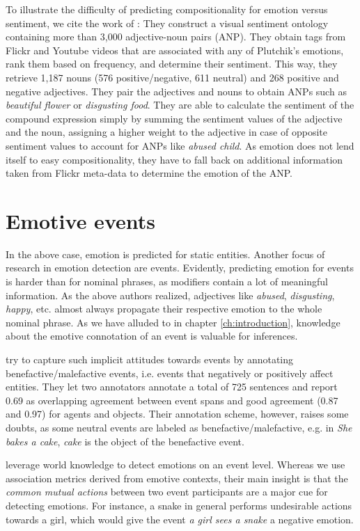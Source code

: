 To illustrate the difficulty of predicting compositionality for emotion versus sentiment, we cite the work of \citeauthor{adjective_noun_pairs}: They construct a visual sentiment ontology containing more than 3,000 adjective-noun pairs (ANP). They obtain tags from Flickr and Youtube videos that are associated with any of Plutchik's emotions, rank them based on frequency, and determine their sentiment. This way, they retrieve 1,187 nouns (576 positive/negative, 611 neutral) and 268 positive and negative adjectives. They pair the adjectives and nouns to obtain ANPs such as \textit{beautiful flower} or \textit{disgusting food}. They are able to calculate the sentiment of the compound expression simply by summing the sentiment values of the adjective and the noun, assigning a higher weight to the adjective in case of opposite sentiment values to account for ANPs like \textit{abused child}. As emotion does not lend itself to easy compositionality, they have to fall back on additional information taken from Flickr meta-data to determine the emotion of the ANP.

\section{Emotive events} \label{sec:emotive_events}

In the above case, emotion is predicted for static entities. Another focus of research in emotion detection are events. Evidently, predicting emotion for events is harder than for nominal phrases, as modifiers contain a lot of meaningful information. As the above authors realized, adjectives like \textit{abused}, \textit{disgusting}, \textit{happy}, etc. almost always propagate their respective emotion to the whole nominal phrase. As we have alluded to in chapter \ref{ch:introduction}, knowledge about the emotive connotation of an event is valuable for inferences.

\citeauthor{benefactive_malefactive} try to capture such implicit attitudes towards events by annotating benefactive/malefactive events, i.e. events that negatively or positively affect entities. They let two annotators annotate a total of 725 sentences and report 0.69 as overlapping agreement between event spans and good agreement (0.87 and 0.97) for agents and objects. Their annotation scheme, however, raises some doubts, as some neutral events are labeled as benefactive/malefactive, e.g. in \textit{She bakes a cake}, \textit{cake} is the object of the benefactive event.

\citeauthor{mutual_action} leverage world knowledge to detect emotions on an event level. Whereas we use association metrics derived from emotive contexts, their main insight is that the \textit{common mutual actions} between two event participants are a major cue for detecting emotions. For instance, a snake in general performs undesirable actions towards a girl, which would give the event \textit{a girl sees a snake} a negative emotion.

